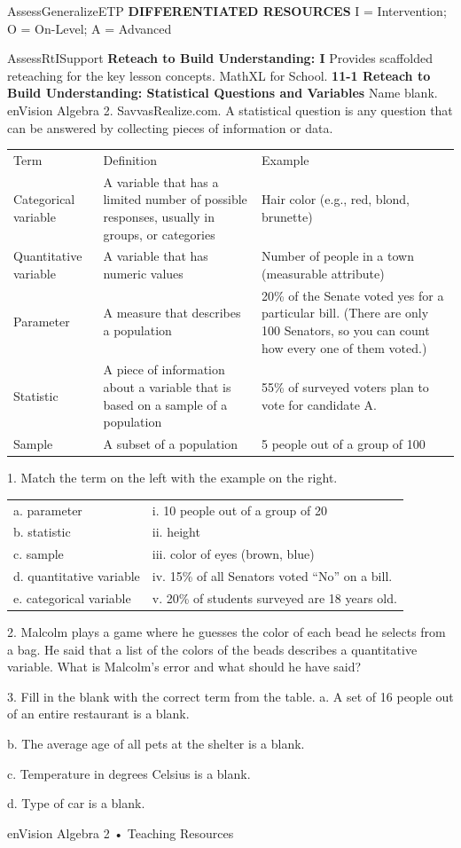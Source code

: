 \documentclass{article}
\newenvironment{te-addendum}[2]{}{}     %
\newcommand{\answer}[1]{}               %
\newcommand{\uncertain}[2]{#1}          %
\begin{document}
\begin{te-addendum}{Assess}{GeneralizeETP}
\textbf{DIFFERENTIATED RESOURCES}
I = Intervention; O = On-Level; A = Advanced
\end{te-addendum}
\begin{te-addendum}{Assess}{RtISupport}
\textbf{Reteach to Build Understanding: I}
Provides scaffolded reteaching for the key lesson concepts. MathXL for School.
\textbf{11-1 Reteach to Build Understanding: Statistical Questions and Variables}
Name blank. enVision Algebra 2. SavvasRealize.com.
A statistical question is any question that can be answered by collecting pieces of information or data.
\begin{tabular}{lll}
Term & Definition & Example \\
Categorical variable & A variable that has a limited number of possible responses, usually in groups, or categories & Hair color (e.g., red, blond, brunette) \\
Quantitative variable & A variable that has numeric values & Number of people in a town (measurable attribute) \\
Parameter & A measure that describes a population & 20\% of the Senate voted yes for a particular bill. (There are only 100 Senators, so you can count how \uncertain{every one}{many} of them voted.) \\
Statistic & A piece of information about a variable that is based on a sample of a population & 55\% of surveyed voters plan to vote for candidate A. \\
Sample & A subset of a population & 5 people out of a group of 100 \\
\end{tabular}

1. Match the term on the left with the example on the right.
\begin{tabular}{ll}
a. parameter & i. 10 people out of a group of 20 \\
b. statistic & ii. height \\
c. sample & iii. color of eyes (brown, blue) \\
d. quantitative variable & iv. 15\% of all Senators voted ``No'' on a bill. \\
e. categorical variable & v. 20\% of students surveyed are 18 years old. \\
\end{tabular}
\answer{1. a--iv; b--v; c--i; d--ii; e--iii.}
2. Malcolm plays a game where he guesses the color of each bead he selects from a bag. He said that a list of the colors of the beads describes a quantitative variable. What is Malcolm's error and what should he have said?
\answer{Colors are qualitative, not numerical values, so the variable is categorical.}
3. Fill in the blank with the correct term from the table.
a. A set of 16 people out of an entire restaurant is a blank.
\answer{sample}
b. The average age of all pets at the shelter is a blank.
\answer{parameter}
c. Temperature in degrees Celsius is a blank.
\answer{quantitative variable}
d. Type of car is a blank.
\answer{categorical variable}
enVision Algebra 2 • Teaching Resources
\end{te-addendum}
\end{document}
